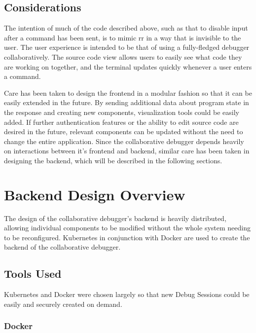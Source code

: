 \documentclass[12pt]{article}
\begin{document}
\subsection{Considerations} \label{vistools}

The intention of much of the code described above, such as that to
disable input after a command has been sent, is to mimic rr in a way
that is invisible to the user.  The user experience is intended to be
that of using a fully-fledged debugger collaboratively.  The source
code view allows users to easily see what code they are working on
together, and the terminal updates quickly whenever a user enters a
command.
\par

Care has been taken to design the frontend in a modular fashion so
that it can be easily extended in the future.  By sending additional
data about program state in the response and creating new components,
visualization tools could be easily added.  If further authentication
features or the ability to edit source code are desired in the future,
relevant components can be updated without the need to change the
entire application.  Since the collaborative debugger depends heavily
on interactions between it's frontend and backend, similar care has
been taken in designing the backend, which will be described in the
following sections.

\section{Backend Design Overview}

The design of the collaborative debugger's backend is heavily
distributed, allowing individual components to be modified without the
whole system needing to be reconfigured.  Kubernetes in conjunction
with Docker are used to create the backend of the collaborative
debugger.

\subsection{Tools Used}

Kubernetes and Docker were chosen largely so that new Debug Sessions
could be easily and securely created on demand.

\subsubsection{Docker}\label{docker}
\end{document}
